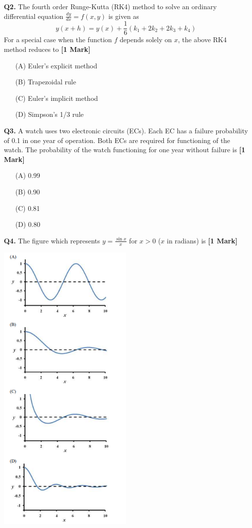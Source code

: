 \documentclass[11pt]{article}
\newcommand{\questiona}[2]{
    \noindent\textbf{Q#2.} #1 \hfill \textbf{[1 Mark]}
}
\begin{document}
\questiona{The fourth order Runge-Kutta (RK4) method to solve an ordinary differential equation \(\frac{dy}{dx} = f(x, y)\) is given as
\[y(x + h) = y(x) + \frac{1}{6}(k_1 + 2k_2 + 2k_3 + k_4)\]
For a special case when the function \(f\) depends solely on \(x\), the above RK4 method reduces to}{2}
\begin{enumerate}
    \item[(A)] Euler's explicit method  
    \item[(B)] Trapezoidal rule  
    \item[(C)] Euler's implicit method  
    \item[(D)] Simpson's 1/3 rule  
\end{enumerate}

\questiona{A watch uses two electronic circuits (ECs). Each EC has a failure probability of 0.1 in one year of operation. Both ECs are required for functioning of the watch. The probability of the watch functioning for one year without failure is}{3}
\begin{enumerate}
    \item[(A)] 0.99  
    \item[(B)] 0.90  
    \item[(C)] 0.81  
    \item[(D)] 0.80  
\end{enumerate}

\questiona{The figure which represents \(y = \frac{\sin x}{x}\) for \(x > 0\) (\(x\) in radians) is}{4}
\begin{center}
\includegraphics[width=0.5\textwidth]{figures/Q4.png}
\end{center}
\end{document}

